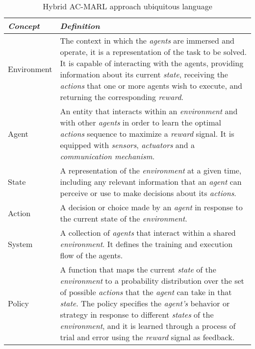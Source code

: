 \begin{table}
    \centering
    \begin{tabularx}{\textwidth}{lX}
        \hline
        \textbf{\emph{Concept}} & \textbf{\emph{Definition}} \\
        \hline
        Environment & The context in which the \emph{agents} are immersed and operate,
                        it is a representation of the task to be solved.
                        It is capable of interacting with the agents, providing information
                        about its current \emph{state}, receiving the \emph{actions} that one or more agents
                        wish to execute, and returning the corresponding \emph{reward}. \\
        \hline
        Agent       & An entity that interacts within an \emph{environment} and with other \emph{agents}
                        in order to learn the optimal \emph{actions} sequence to maximize a \emph{reward} signal. 
                        It is equipped with \emph{sensors}, \emph{actuators} and a \emph{communication mechanism}. \\
        \hline
        State       & A representation of the \emph{environment} at a given time, 
                        including any relevant information that an \emph{agent} can perceive 
                        or use to make decisions about its \emph{actions}. \\
        \hline
        Action      & A decision or choice made by an \emph{agent} in response to the current 
                        state of the \emph{environment}. \\
        \hline
        System      & A collection of \emph{agents} that interact within a shared \emph{environment}. 
                        It defines the training and execution flow of the agents. \\
        \hline
        Policy      & A function that maps the current \emph{state} of the \emph{environment} to a probability 
                        distribution over the set of possible \emph{actions} that the \emph{agent} 
                        can take in that \emph{state}. The policy specifies the \emph{agent's} behavior 
                        or strategy in response to different \emph{states} of the \emph{environment}, 
                        and it is learned through a process of trial and error using the 
                        \emph{reward} signal as feedback. \\
        \hline
    \end{tabularx}
    \caption{Hybrid AC-MARL approach ubiquitous language}
    \label{tab:ul}
\end{table}